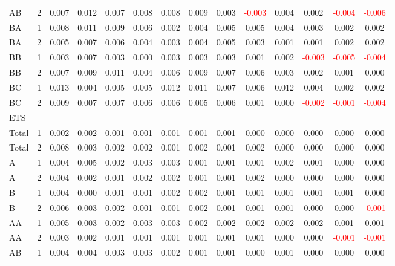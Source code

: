 \begin{table}[H]
{\begin{tabular}{llcccccccccccc}
AB & 2 & 0.007 & 0.012 & 0.007 & 0.008 & 0.008 & 0.009 & 0.003 & \textcolor{red}{-0.003} & 0.004 & 0.002 & \textcolor{red}{-0.004} & \textcolor{red}{-0.006}\\
BA & 1 & 0.008 & 0.011 & 0.009 & 0.006 & 0.002 & 0.004 & 0.005 & 0.005 & 0.004 & 0.003 & 0.002 & 0.002\\
BA & 2 & 0.005 & 0.007 & 0.006 & 0.004 & 0.003 & 0.004 & 0.005 & 0.003 & 0.001 & 0.001 & 0.002 & 0.002\\
BB & 1 & 0.003 & 0.007 & 0.003 & 0.000 & 0.003 & 0.003 & 0.003 & 0.001 & 0.002 & \textcolor{red}{-0.003} & \textcolor{red}{-0.005} & \textcolor{red}{-0.004}\\
BB & 2 & 0.007 & 0.009 & 0.011 & 0.004 & 0.006 & 0.009 & 0.007 & 0.006 & 0.003 & 0.002 & 0.001 & 0.000\\
BC & 1 & 0.013 & 0.004 & 0.005 & 0.005 & 0.012 & 0.011 & 0.007 & 0.006 & 0.012 & 0.004 & 0.002 & 0.002\\
BC & 2 & 0.009 & 0.007 & 0.007 & 0.006 & 0.006 & 0.005 & 0.006 & 0.001 & 0.000 & \textcolor{red}{-0.002} & \textcolor{red}{-0.001} & \textcolor{red}{-0.004}\\
\hline
ETS &  &  &  &  &  &  &  &  &  &  &  &  & \\
\hline
Total & 1 & 0.002 & 0.002 & 0.001 & 0.001 & 0.001 & 0.001 & 0.001 & 0.000 & 0.000 & 0.000 & 0.000 & 0.000\\
Total & 2 & 0.008 & 0.003 & 0.002 & 0.002 & 0.001 & 0.002 & 0.001 & 0.002 & 0.000 & 0.000 & 0.000 & 0.000\\
A & 1 & 0.004 & 0.005 & 0.002 & 0.003 & 0.003 & 0.001 & 0.001 & 0.001 & 0.002 & 0.001 & 0.000 & 0.000\\
A & 2 & 0.004 & 0.002 & 0.001 & 0.002 & 0.002 & 0.001 & 0.001 & 0.002 & 0.000 & 0.000 & 0.000 & 0.000\\
B & 1 & 0.004 & 0.000 & 0.001 & 0.001 & 0.002 & 0.002 & 0.001 & 0.001 & 0.001 & 0.001 & 0.001 & 0.000\\
B & 2 & 0.006 & 0.003 & 0.002 & 0.001 & 0.001 & 0.002 & 0.001 & 0.001 & 0.001 & 0.000 & 0.000 & \textcolor{red}{-0.001}\\
AA & 1 & 0.005 & 0.003 & 0.002 & 0.003 & 0.003 & 0.002 & 0.002 & 0.002 & 0.002 & 0.002 & 0.001 & 0.001\\
AA & 2 & 0.003 & 0.002 & 0.001 & 0.001 & 0.001 & 0.001 & 0.001 & 0.001 & 0.000 & 0.000 & \textcolor{red}{-0.001} & \textcolor{red}{-0.001}\\
AB & 1 & 0.004 & 0.004 & 0.003 & 0.003 & 0.002 & 0.001 & 0.001 & 0.000 & 0.001 & 0.000 & 0.000 & 0.000\\

\end{tabular}}
\end{table}
